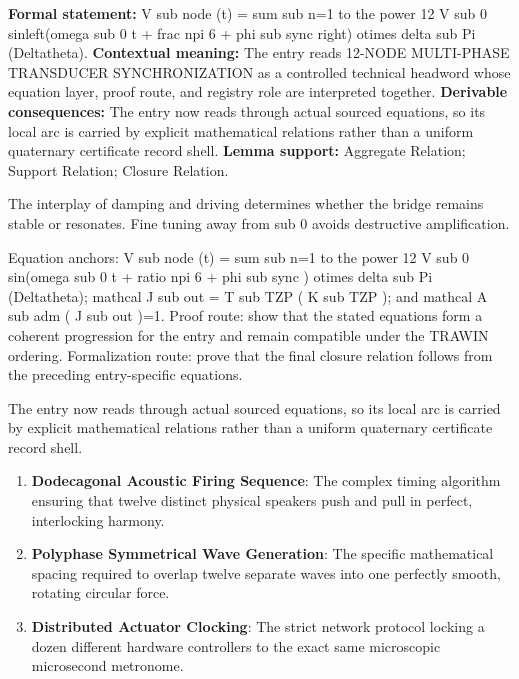 \begingroup\footnotesize\setlength{\emergencystretch}{3em}\sloppy
\textbf{Formal statement:} V sub node (t) = sum sub n=1 to the power 12 V sub 0 sinleft(omega sub 0 t + frac npi 6 + phi sub sync right) otimes delta sub Pi (Deltatheta). \textbf{Contextual meaning:} The entry reads 12-NODE MULTI-PHASE TRANSDUCER SYNCHRONIZATION as a controlled technical headword whose equation layer, proof route, and registry role are interpreted together. \textbf{Derivable consequences:} The entry now reads through actual sourced equations, so its local arc is carried by explicit mathematical relations rather than a uniform quaternary certificate record shell. \textbf{Lemma support:} Aggregate Relation; Support Relation; Closure Relation.\par
\endgroup

The interplay of damping and driving determines whether the bridge remains stable or resonates. Fine tuning away from sub 0 avoids destructive amplification.

Equation anchors: V sub node (t) = sum sub n=1 to the power 12 V sub 0 sin(omega sub 0 t + ratio npi 6 + phi sub sync ) otimes delta sub Pi (Deltatheta); mathcal J sub out = T sub TZP ( K sub TZP ); and mathcal A sub adm ( J sub out )=1. Proof route: show that the stated equations form a coherent progression for the entry and remain compatible under the TRAWIN ordering. Formalization route: prove that the final closure relation follows from the preceding entry-specific equations.

The entry now reads through actual sourced equations, so its local arc is carried by explicit mathematical relations rather than a uniform quaternary certificate record shell.
\endgroup

\begin{enumerate}[leftmargin=1.6em,itemsep=6pt,topsep=4pt]
\item \textbf{Dodecagonal Acoustic Firing Sequence}: The complex timing algorithm ensuring that twelve distinct physical speakers push and pull in perfect, interlocking harmony.
\item \textbf{Polyphase Symmetrical Wave Generation}: The specific mathematical spacing required to overlap twelve separate waves into one perfectly smooth, rotating circular force.
\item \textbf{Distributed Actuator Clocking}: The strict network protocol locking a dozen different hardware controllers to the exact same microscopic microsecond metronome.
\end{enumerate}


